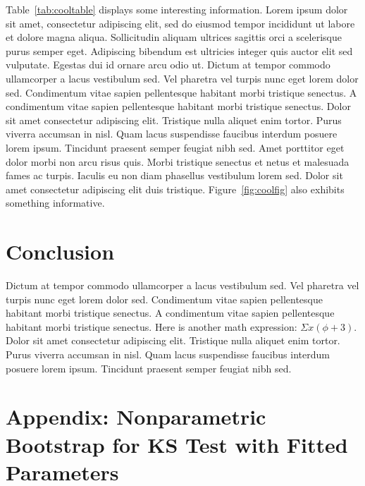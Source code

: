 \documentclass[12pt, letterpaper]{article}
\begin{document}
Table~\ref{tab:cooltable} displays some interesting information. 
Lorem ipsum dolor sit amet, consectetur adipiscing elit, sed do eiusmod tempor 
incididunt ut labore et dolore magna aliqua. Sollicitudin aliquam ultrices 
sagittis orci a scelerisque purus semper eget. Adipiscing bibendum est ultricies 
integer quis auctor elit sed vulputate. Egestas dui id ornare arcu odio ut. 
Dictum at tempor commodo ullamcorper a lacus vestibulum sed. Vel pharetra vel 
turpis nunc eget lorem dolor sed. Condimentum vitae sapien pellentesque habitant 
morbi tristique senectus. A condimentum vitae sapien pellentesque habitant morbi 
tristique senectus. Dolor sit amet consectetur adipiscing elit. Tristique nulla 
aliquet enim tortor. Purus viverra accumsan in nisl. Quam lacus suspendisse 
faucibus interdum posuere lorem ipsum. Tincidunt praesent semper feugiat nibh 
sed. Amet porttitor eget dolor morbi non arcu risus quis. Morbi tristique 
senectus et netus et malesuada fames ac turpis. Iaculis eu non diam phasellus 
vestibulum lorem sed. Dolor sit amet consectetur adipiscing elit duis tristique.
Figure~\ref{fig:coolfig} also exhibits something informative.

\section{Conclusion}
\label{sec:conclusion}

Dictum at tempor commodo ullamcorper a lacus vestibulum sed. Vel pharetra vel 
turpis nunc eget lorem dolor sed. Condimentum vitae sapien pellentesque habitant 
morbi tristique senectus. A condimentum vitae sapien pellentesque habitant morbi 
tristique senectus. Here is another math expression: $\Sigma x(\phi + 3)$. Dolor 
sit amet consectetur adipiscing elit. Tristique nulla 
aliquet enim tortor. Purus viverra accumsan in nisl. Quam lacus suspendisse 
faucibus interdum posuere lorem ipsum. Tincidunt praesent semper feugiat nibh 
sed. 

\appendix

\section{Appendix: Nonparametric Bootstrap for KS Test with Fitted Parameters}





\end{document}
